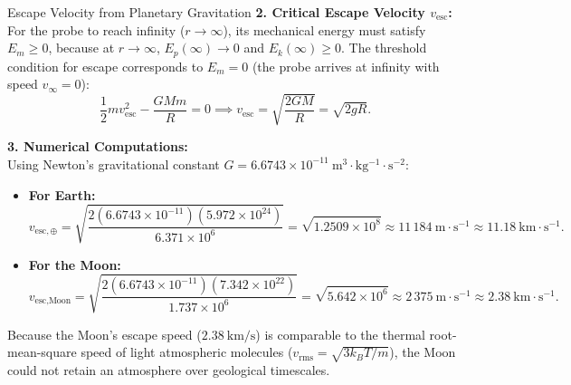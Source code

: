 \begin{workedexample}{Escape Velocity from Planetary Gravitation}
\textbf{2. Critical Escape Velocity $v_{\text{esc}}$:}\\
For the probe to reach infinity ($r \to \infty$), its mechanical energy must satisfy $E_m \ge 0$, because at $r \to \infty$, $E_p(\infty) \to 0$ and $E_k(\infty) \ge 0$.
The threshold condition for escape corresponds to $E_m = 0$ (the probe arrives at infinity with speed $v_\infty = 0$):
\[
\frac{1}{2} m v_{\text{esc}}^2 - \frac{G M m}{R} = 0 \implies v_{\text{esc}} = \sqrt{\frac{2GM}{R}} = \sqrt{2gR}.
\]

\textbf{3. Numerical Computations:}\\
Using Newton's gravitational constant $G = 6.6743\times 10^{-11}\ \mathrm{m^3\cdot kg^{-1}\cdot s^{-2}}$:
\begin{itemize}[leftmargin=1.5em,itemsep=3pt]
  \item \textbf{For Earth:}
  \[
  v_{\text{esc},\oplus} = \sqrt{\frac{2(6.6743\times 10^{-11})(5.972\times 10^{24})}{6.371\times 10^6}} = \sqrt{1.2509\times 10^8} \approx 11\,184\ \mathrm{m\cdot s^{-1}} \approx 11.18\ \mathrm{km\cdot s^{-1}}.
  \]
  \item \textbf{For the Moon:}
  \[
  v_{\text{esc},\text{Moon}} = \sqrt{\frac{2(6.6743\times 10^{-11})(7.342\times 10^{22})}{1.737\times 10^6}} = \sqrt{5.642\times 10^6} \approx 2\,375\ \mathrm{m\cdot s^{-1}} \approx 2.38\ \mathrm{km\cdot s^{-1}}.
  \]
\end{itemize}
Because the Moon's escape speed ($2.38\ \mathrm{km/s}$) is comparable to the thermal root-mean-square speed of light atmospheric molecules ($v_{\text{rms}} = \sqrt{3k_B T/m}$), the Moon could not retain an atmosphere over geological timescales.
\end{workedexample}

